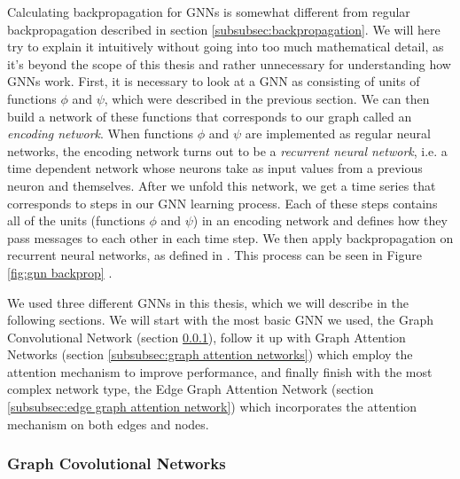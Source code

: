 \documentclass[times, utf8, diplomski, english]{fer_eng}
\begin{document}
Calculating backpropagation for GNNs is somewhat different from regular backpropagation described in section \ref{subsubsec:backpropagation}. We will here try to explain it intuitively without going into too much mathematical detail, as it's beyond the scope of this thesis and rather unnecessary for understanding how GNNs work. First, it is necessary to look at a GNN as consisting of units of functions $\phi$ and $\psi$, which were described in the previous section. We can then build a network of these functions that corresponds to our graph called an \textit{encoding network}. When functions $\phi$ and $\psi$ are implemented as regular neural networks, the encoding network turns out to be a \textit{recurrent neural network}, i.e. a time dependent network whose neurons take as input values from a previous neuron and themselves. After we unfold this network, we get a time series that corresponds to steps in our GNN learning process. Each of these steps contains all of the units (functions $\phi$ and $\psi$) in an encoding network and defines how they pass messages to each other in each time step. We then apply backpropagation on recurrent neural networks, as defined in \cite{rnn_backprop}. This process can be seen in Figure \ref{fig:gnn backprop} \cite{GNN}.

We used three different GNNs in this thesis, which we will describe in the following sections. We will start with the most basic GNN we used, the Graph Convolutional Network (section \ref{subsubsec:graph convolutional netwroks}), follow it up with Graph Attention Networks (section \ref{subsubsec:graph attention networks}) which employ the attention mechanism to improve performance, and finally finish with the most complex network type, the Edge Graph Attention Network (section \ref{subsubsec:edge graph attention network}) which incorporates the attention mechanism on both edges and nodes.

\subsubsection{Graph Covolutional Networks}
\label{subsubsec:graph convolutional netwroks}
\end{document}
